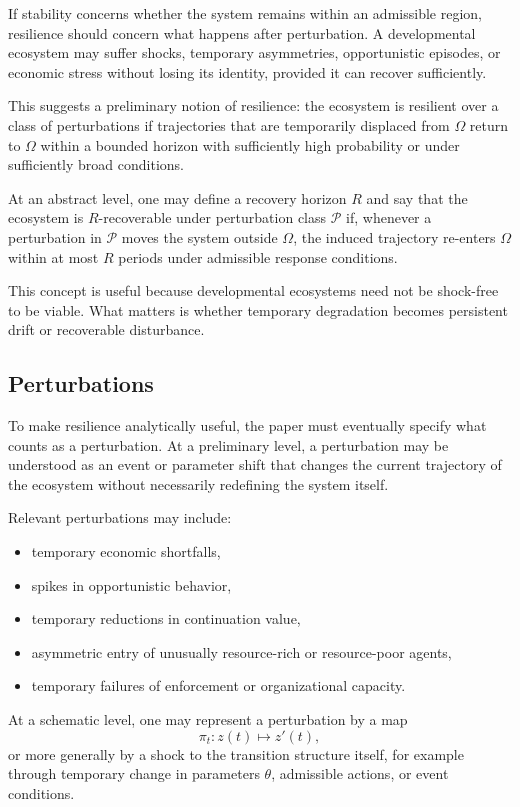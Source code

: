 \documentclass[11pt]{article}
\begin{document}
If stability concerns whether the system remains within an admissible region, resilience should concern what happens after perturbation. A developmental ecosystem may suffer shocks, temporary asymmetries, opportunistic episodes, or economic stress without losing its identity, provided it can recover sufficiently.

This suggests a preliminary notion of resilience: the ecosystem is resilient over a class of perturbations if trajectories that are temporarily displaced from \(\Omega\) return to \(\Omega\) within a bounded horizon with sufficiently high probability or under sufficiently broad conditions.

At an abstract level, one may define a recovery horizon \(R\) and say that the ecosystem is \(R\)-recoverable under perturbation class \(\mathcal{P}\) if, whenever a perturbation in \(\mathcal{P}\) moves the system outside \(\Omega\), the induced trajectory re-enters \(\Omega\) within at most \(R\) periods under admissible response conditions.

This concept is useful because developmental ecosystems need not be shock-free to be viable. What matters is whether temporary degradation becomes persistent drift or recoverable disturbance.

\subsection{Perturbations}

To make resilience analytically useful, the paper must eventually specify what counts as a perturbation. At a preliminary level, a perturbation may be understood as an event or parameter shift that changes the current trajectory of the ecosystem without necessarily redefining the system itself.

Relevant perturbations may include:
\begin{itemize}
  \item temporary economic shortfalls,
  \item spikes in opportunistic behavior,
  \item temporary reductions in continuation value,
  \item asymmetric entry of unusually resource-rich or resource-poor agents,
  \item temporary failures of enforcement or organizational capacity.
\end{itemize}

At a schematic level, one may represent a perturbation by a map
\[
\pi_t : z(t) \mapsto z'(t),
\]
or more generally by a shock to the transition structure itself, for example through temporary change in parameters \(\theta\), admissible actions, or event conditions.
\end{document}
